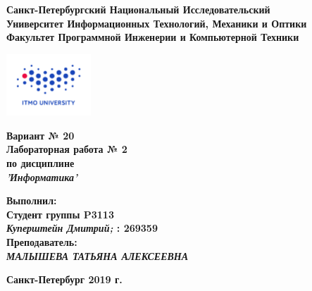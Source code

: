 \documentclass[11pt]{article}
\author{АВТОР}
\date{\today}
\title{}
\begin{document}
\large
\thispagestyle{empty}
\begin{center}
\textbf{Санкт-Петербургский Национальный Исследовательский}\\
\textbf{Университет Информационных Технологий, Механики и Оптики}\\
\textbf{Факультет Программной Инженерии и Компьютерной Техники}\\
\end{center}
\vspace{1em}
\begin{center}
\includegraphics[width=120px]{../../../itmo-logo.png}
\end{center}
\LARGE
\vspace{5em}
\begin{center}
\textbf{Вариант № 20}\\
\textbf{Лабораторная работа № 2}\\
\Large
\textbf{по дисциплине}\\
\LARGE
\textbf{\emph{'Информатика'}}\\
\end{center}
\vspace{11em}
\large
\begin{flushright}
\textbf{Выполнил:}\\
\textbf{Студент группы P3113}\\
\textbf{\emph{Куперштейн Дмитрий;} : 269359}\\
\textbf{Преподаватель:}\\
\textbf{\emph{МАЛЫШЕВА ТАТЬЯНА АЛЕКСЕЕВНА}}\\
\end{flushright}
\vspace{4em}
\large
\begin{center}
\textbf{Санкт-Петербург 2019 г.}
\end{center}
\pagebreak{}
\setcounter{tocdepth}{2}
\tableofcontents
\vspace{2em}
\pagebreak{}
\end{document}
